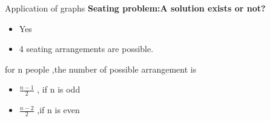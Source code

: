 \documentclass{beamer}
\begin{document}
\begin{frame}{Application of graphs}
	\textbf{Seating problem:A solution exists or not?}
	\begin{itemize}
		\item Yes
		\item 4 seating arrangements are possible.
	\end{itemize}
for n people ,the number of possible arrangement is 
\begin{itemize}
	\item $\frac{n-1}{2}$ , if n is odd
	\item $\frac{n-2}{2}$ ,if n is even
	
\end{itemize}
		
\end{frame}
\end{document}
